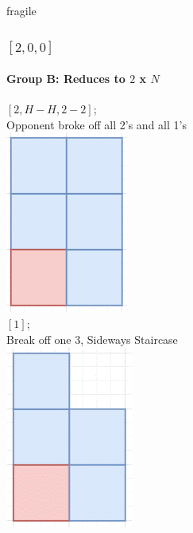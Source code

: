 \documentclass[aspectratio=169,usenames,dvipsnames]{beamer}
\begin{document}
\begin{frame}{fragile}
    \frametitle{$[2, 0, 0]$}
    \framesubtitle{Group B: Reduces to $2$ x $N$}
    
    \begin{multicols}{2}
    $[2, H - H, 2 - 2]$; \\
    Opponent broke off all 2’s and all 1’s\\
    \includegraphics[scale=.4]{images/[2, 0, 0].png}\\
    $[1]$; \\
    Break off one 3, Sideways Staircase\\
    \includegraphics[scale=.4]{images/[1, 1, 0].png}
    \end{multicols}
\end{frame}
\end{document}
